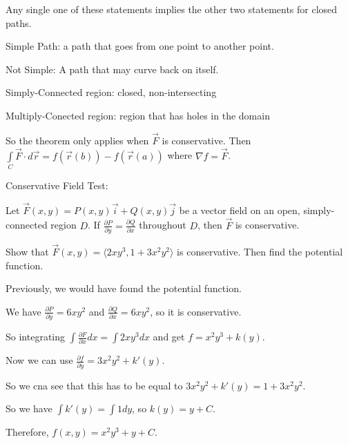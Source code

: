 \documentclass[../calc3.tex]{subfiles}
\begin{document}
Any single one of these statements implies the other two statements for closed paths.

Simple Path: a path that goes from one point to another point.

Not Simple: A path that may curve back on itself.

Simply-Connected region: closed, non-intersecting 

Multiply-Conected region: region that has holes in the domain

So the theorem only applies when $\vec{F}$ is conservative. Then $\int\limits_{C}\vec{F}\cdot d\vec{r}=f(\vec{r}(b))-f(\vec{r}(a))$ where $\nabla f = \vec{F}$.

Conservative Field Test:

Let $\vec{F}(x,y)=P(x,y)\vec{i}+Q(x,y)\vec{j}$ be a vector field on an open, simply-connected region $D$. If $\frac{\partial P}{\partial y}=\frac{\partial Q}{\partial x}$ throughout $D$, then $\vec{F}$ is conservative.

\pagebreak
\begin{example}
    Show that $\vec{F}(x,y)=\langle 2xy^3,1+3x^2y^2\rangle$ is conservative. Then find the potential function.

    Previously, we would have found the potential function.

    We have $\frac{\partial P}{\partial y}=6xy^2$ and $\frac{\partial Q}{\partial x}=6xy^2$, so it is conservative.

    So integrating $\int\frac{\partial F}{\partial x}dx = \int 2xy^3 dx$ and get $f=x^2y^3+k(y)$.

    Now we can use $\frac{\partial f}{\partial y}=3x^2y^2+k'(y)$.

    So we cna see that this has to be equal to $3x^2y^2+k'(y)=1+3x^2y^2$.

    So we have $\int k'(y)=\int 1 dy$, so $k(y)=y+C$.

    Therefore, $f(x,y)=x^2y^3+y+C$.
\end{example}
\end{document}
